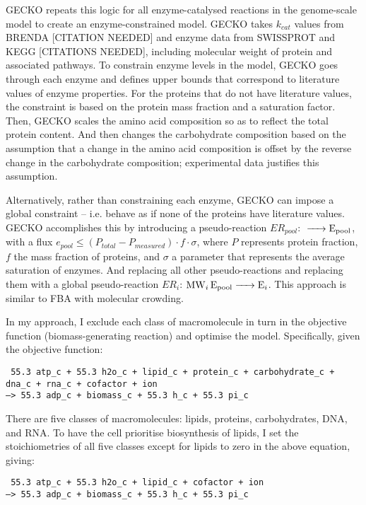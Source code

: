 GECKO repeats this logic for all enzyme-catalysed reactions in the genome-scale model to create an enzyme-constrained model.
GECKO takes $k_{cat}$ values from BRENDA [CITATION NEEDED] and enzyme data from SWISSPROT and KEGG [CITATIONS NEEDED], including molecular weight of protein and associated pathways.
To constrain enzyme levels in the model, GECKO goes through each enzyme and defines upper bounds that correspond to literature values of enzyme properties.
For the proteins that do not have literature values, the constraint is based on the protein mass fraction and a saturation factor.
Then, GECKO scales the amino acid composition so as to reflect the total protein content.
And then changes the carbohydrate composition based on the assumption that a change in the amino acid composition is offset by the reverse change in the carbohydrate composition;
experimental data justifies this assumption.

Alternatively, rather than constraining each enzyme, GECKO can impose a global constraint -- i.e. behave as if none of the proteins have literature values.
GECKO accomplishes this by introducing a pseudo-reaction $ER_{pool}$: $\ce{ -> E_{pool} }$, with a flux $e_{pool} \le (P_{total} - P_{measured}) \cdot f \cdot \sigma$, where $P$ represents protein fraction, $f$ the mass fraction of proteins, and $\sigma$ a parameter that represents the average saturation of enzymes.
And replacing all other pseudo-reactions and replacing them with a global pseudo-reaction $ER_{i}$: $\ce{ MW_{i} E_{pool} -> E_{i} }$.
This approach is similar to FBA with molecular crowding.

In my approach, I exclude each class of macromolecule in turn in the objective function (biomass-generating reaction) and optimise the model.
Specifically, given the objective function:

\texttt{
  55.3 atp\_c + 55.3 h2o\_c + lipid\_c + protein\_c + carbohydrate\_c + dna\_c + rna\_c + cofactor + ion \\
  --> 55.3 adp\_c + biomass\_c + 55.3 h\_c + 55.3 pi\_c
}

There are five classes of macromolecules: lipids, proteins, carbohydrates, DNA, and RNA.
To have the cell prioritise biosynthesis of lipids, I set the stoichiometries of all five classes except for lipids to zero in the above equation, giving:

\texttt{
  55.3 atp\_c + 55.3 h2o\_c + lipid\_c + cofactor + ion \\
  --> 55.3 adp\_c + biomass\_c + 55.3 h\_c + 55.3 pi\_c
}

